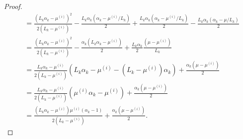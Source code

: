 \documentclass[12pt]{article}
\begin{document}
\begin{proof}
\begin{align*}
                &=
                \frac{\left(
                    L_k\alpha_k - \mu^{(i)}
                \right)^2}{2(L_k - \mu^{(i)})} 
                - \frac{L_k\alpha_k(\alpha_k - \mu^{(i)}/L_k)}{2}
                + \frac{L_k\alpha_k(\alpha_k - \mu^{(i)}/L_k)}{2} 
                - \frac{L_k\alpha_k(\alpha_k - \mu/L_k)}{2} 
                \\
                &= 
                \frac{\left(
                    L_k\alpha_k - \mu^{(i)}
                \right)^2}{2(L_k - \mu^{(i)})} 
                - \frac{\alpha_k\left(L_k\alpha_k - \mu^{(i)}\right)}{2}
                + \frac{L_k\alpha_k}{2}
                \frac{\left(
                    \mu - \mu^{(i)}
                \right)}{L_k}
                \\
                &=
                \frac{L_k \alpha_k - \mu^{(i)}}{2(L_k - \mu^{(i)})}\left(
                    L_k \alpha_k - \mu^{(i)} 
                    - \left(L_k - \mu^{(i)}\right)\alpha_k
                \right)
                + \frac{\alpha_k(\mu - \mu^{(i)})}{2}
                \\
                &= \frac{L_k \alpha_k - \mu^{(i)}}{2(L_k - \mu^{(i)})}\left(
                    \mu^{(i)}\alpha_k - \mu^{(i)} 
                \right)
                + \frac{\alpha_k(\mu - \mu^{(i)})}{2}
                \\
                &= 
                \frac{
                    \left(L_k \alpha_k - \mu^{(i)}\right)\mu^{(i)}
                    \left(\alpha_k - 1\right)
                }
                {2(L_k - \mu^{(i)})}
                + \frac{\alpha_k(\mu - \mu^{(i)})}{2}. 
            \end{align*}
        \end{proof}
\end{document}
